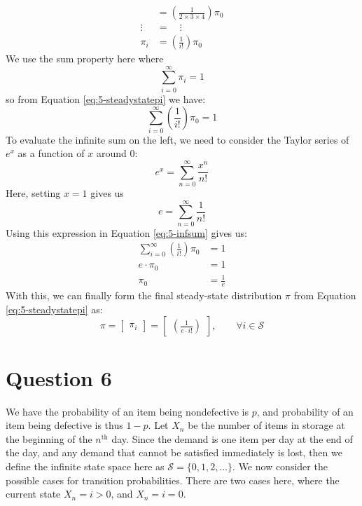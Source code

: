 \documentclass[12pt]{article}
\begin{document}
\begin{align}
    &= \left( \frac{1}{2 \times 3 \times 4} \right)\pi_0 \\ \nonumber
    \vdots &= \quad \vdots \\ \label{eq:5-steadystatepi}
    \pi_i &= \left( \frac{1}{i!} \right)\pi_0
\end{align} We use the sum property here where \begin{equation}
    \sum_{i=0}^{\infty} \pi_i = 1
\end{equation} so from Equation \ref{eq:5-steadystatepi} we have: \begin{equation}\label{eq:5-infsum}
    \sum_{i=0}^{\infty} \left( \frac{1}{i!} \right)\pi_0 = 1 
\end{equation} To evaluate the infinite sum on the left, we need to consider the Taylor series of $e^{x}$ as a function of $x$ around 0: \begin{equation}
    e^{x} = \sum_{n = 0}^{\infty} \frac{x^{n}}{n!}
\end{equation} Here, setting $x = 1$ gives us \begin{equation}
    e = \sum_{n=0}^{\infty} \frac{1}{n!}
\end{equation} Using this expression in Equation \ref{eq:5-infsum} gives us: \begin{align*}
    \sum_{i=0}^{\infty} \left( \frac{1}{i!} \right)\pi_0 &= 1 \\ 
    e \cdot \pi_0 &= 1 \\ 
    \pi_0 &= \frac{1}{e}
\end{align*} With this, we can finally form the final steady-state distribution $\pi$ from Equation \ref{eq:5-steadystatepi} as: \begin{equation}
    \pi = \begin{bmatrix}
        \pi_i
    \end{bmatrix} = \begin{bmatrix}
        \left( \displaystyle\frac{1}{e \cdot i!} \right)
    \end{bmatrix}, \qquad \forall i \in \mathcal{S}
\end{equation}

\section*{Question 6}

We have the probability of an item being nondefective is $p$, and probability of an item being defective is thus $1-p$. Let $X_n$ be the number of items in storage at the beginning of the $n^{\text{th}}$ day. Since the demand is one item per day at the end of the day, and any demand that cannot be satisfied immediately is lost, then we define the infinite state space here as $\mathcal{S} = \{0,1,2, \dots\}$. We now consider the possible cases for transition probabilities. There are two cases here, where the current state $X_n = i >0$, and $X_n = i = 0$. \\ 
\end{document}
